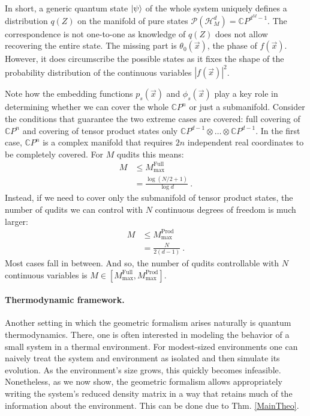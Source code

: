 \documentclass[nofootinbib,pre,twocolumn,showpacs,showkeys,groupaddress,preprintnumbers,floatfix]{revtex4-1}
\newcommand{\1}{\mathbbm{1}}
\begin{document}
In short, a generic quantum state $\ket{\psi}$ of the whole system uniquely
defines a distribution $q(Z)$ on the manifold of pure states
$\mathcal{P}(\mathcal{H}_{M}^d) = \mathbb{C}P^{d^M-1}$. The correspondence is
not one-to-one as knowledge of $q(Z)$ does not allow recovering the entire
state. The missing part is $\theta_0(\vec{x})$, the phase of $f(\vec{x})$.
However, it does circumscribe the possible states as it fixes the shape of the
probability distribution of the continuous variables $|f(\vec{x})|^2$.

Note how the embedding functions $p_s(\vec{x})$ and $\phi_s(\vec{x})$ play a
key role in determining whether we can cover the whole $\mathbb{C}P^n$ or just
a submanifold. Consider the conditions that guarantee the two extreme cases are
covered: full covering of $\mathbb{C}P^n$ and covering of tensor product states
only $\mathbb{C}P^{d-1} \otimes \ldots \otimes \mathbb{C}P^{d-1}$. In the first
case, $\mathbb{C}P^n$ is a complex manifold that requires $2n$ independent real 
coordinates to be completely covered. For $M$ qudits this means:
\begin{align*}
M & \leq M^{\mathrm{Full}}_{\max} \\
  & = \frac{\log \left(N/2 + 1\right)}{\log d}
  ~.
\end{align*}
Instead, if we need to cover only the submanifold of tensor product states, the
number of qudits we can control with $N$ continuous degrees of freedom is much
larger:
\begin{align*}
M & \leq M^{\mathrm{Prod}}_{\max} \\
  & = \frac{N}{2(d-1)}
  ~.
\end{align*}
Most cases fall in between. And so, the number of qudits controllable with $N$
continuous variables is $M \in \left[M^{\mathrm{Full}}_{\max},
M^{\mathrm{Prod}}_{\max}\right]$.

\paragraph*{Thermodynamic framework.}
Another setting in which the geometric formalism arises naturally is quantum
thermodynamics. There, one is often interested in modeling the behavior of a
small system in a thermal environment. For modest-sized environments one can
naively treat the system and environment as isolated and then simulate its
evolution. As the environment's size grows, this quickly becomes infeasible.
Nonetheless, as we now show, the geometric formalism allows appropriately
writing the system's reduced density matrix in a way that retains much of the
information about the environment. This can be done due to Thm. \ref{MainTheo}.
\end{document}
